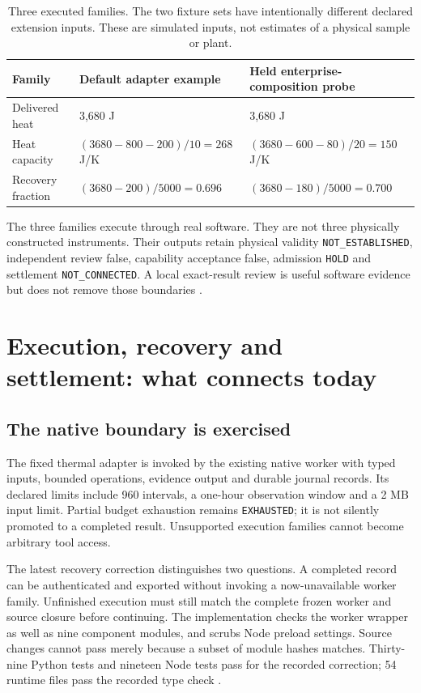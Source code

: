 \documentclass[11pt,a4paper]{article}
\begin{document}
\begin{table}[htbp]
\caption{Three executed families. The two fixture sets have intentionally different declared extension inputs. These are simulated inputs, not estimates of a physical sample or plant.}\label{tab:families}
\small
\begin{tabularx}{\textwidth}{@{}P{31mm}Y Y@{}}
\toprule
Family & Default adapter example & Held enterprise-composition probe\\
\midrule
Delivered heat & 3,680 J & 3,680 J\\
Heat capacity & \((3680-800-200)/10=268\) J/K & \((3680-600-80)/20=150\) J/K\\
Recovery fraction & \((3680-200)/5000=0.696\) & \((3680-180)/5000=0.700\)\\
\bottomrule
\end{tabularx}
\end{table}

The three families execute through real software. They are not three physically constructed instruments. Their outputs retain physical validity \texttt{NOT\_ESTABLISHED}, independent review false, capability acceptance false, admission \texttt{HOLD} and settlement \texttt{NOT\_CONNECTED}. A local exact-result review is useful software evidence but does not remove those boundaries \cite{facadedata}.
\FloatBarrier

\section{Execution, recovery and settlement: what connects today}\label{sec:runtime}
\subsection{The native boundary is exercised}
The fixed thermal adapter is invoked by the existing native worker with typed inputs, bounded operations, evidence output and durable journal records. Its declared limits include 960 intervals, a one-hour observation window and a 2 MB input limit. Partial budget exhaustion remains \texttt{EXHAUSTED}; it is not silently promoted to a completed result. Unsupported execution families cannot become arbitrary tool access.

The latest recovery correction distinguishes two questions. A completed record can be authenticated and exported without invoking a now-unavailable worker family. Unfinished execution must still match the complete frozen worker and source closure before continuing. The implementation checks the worker wrapper as well as nine component modules, and scrubs Node preload settings. Source changes cannot pass merely because a subset of module hashes matches. Thirty-nine Python tests and nineteen Node tests pass for the recorded correction; 54 runtime files pass the recorded type check \cite{recoverydata}.
\end{document}
